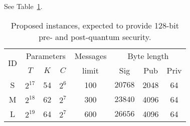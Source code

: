 See Table~\ref{tab:instances}.

\begin{table}
\centering 
\begin{tabular}{c|ccc|c|ccc}
\toprule
\multirow{2}{*}{ID} & \multicolumn{3}{c|}{Parameters} & Messages & \multicolumn{3}{c}{Byte length} \\
& $T$ & $K$ & $C$ & limit & Sig & Pub & Priv \\
\midrule
S & $2^{17}$ & 54 & $2^{6}$ & 100 & $\num{20768}$ & 2048 & 64 \\
M & $2^{18}$ & 62 & $2^{7}$ & 300 & $\num{23840}$ & 4096 & 64 \\
L & $2^{19}$ & 64 & $2^{7}$ & 600 & $\num{26656}$ & 4096 & 64 \\
\bottomrule
\end{tabular}
\caption{Proposed \gravity instances, expected to provide 128-bit pre- and post-quantum security.}
\label{tab:instances}
\end{table}

